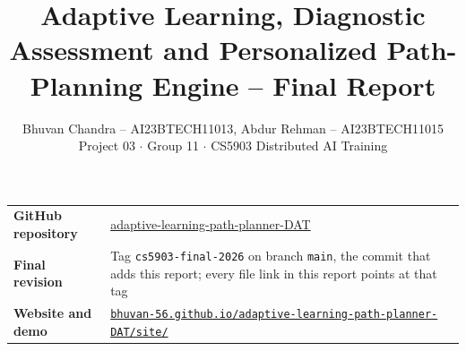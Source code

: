 \documentclass[english]{sintr}
\title{Adaptive Learning, Diagnostic Assessment and Personalized Path-Planning Engine -- Final Report}
\author{Bhuvan Chandra -- AI23BTECH11013, Abdur Rehman -- AI23BTECH11015 \\ Project 03 $\cdot$ Group 11 $\cdot$ CS5903 Distributed AI Training}
\newcommand{\repourl}{https://github.com/Bhuvan-56/adaptive-learning-path-planner-DAT}
\newcommand{\siteurl}{https://bhuvan-56.github.io/adaptive-learning-path-planner-DAT/site/}
\begin{document}
\maketitle

\noindent\begin{tabular}{@{}L{3.48cm}L{11.98cm}@{}}
\textbf{GitHub repository} & \href{\repourl}{adaptive-learning-path-planner-DAT} \\
\textbf{Final revision} & Tag \texttt{cs5903-final-2026} on branch \texttt{main}, the commit that adds this report; every file link in this report points at that tag \\
\textbf{Website and demo} & \href{\siteurl}{\nolinkurl{bhuvan-56.github.io/adaptive-learning-path-planner-DAT/site/}} \\
\end{tabular}
\end{document}
